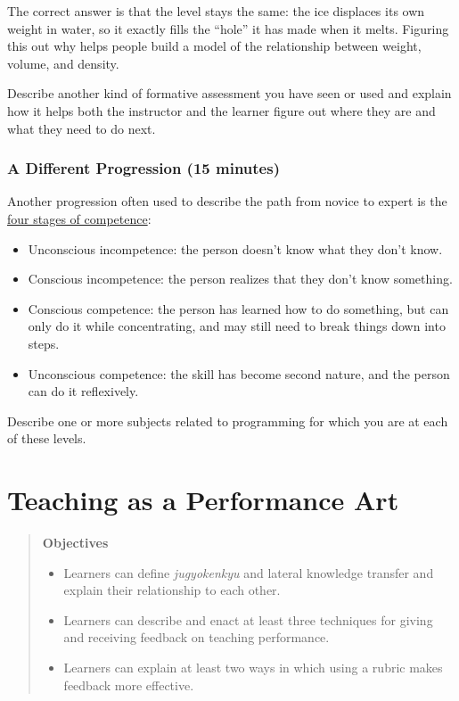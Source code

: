 \documentclass[10pt,statementpaper]{memoir}
\providecommand{\tightlist}{%
  \setlength{\itemsep}{0pt}\setlength{\parskip}{0pt}}
\begin{document}
The correct answer is that the level stays the same: the ice displaces
its own weight in water, so it exactly fills the ``hole'' it has made
when it melts. Figuring this out why helps people build a model of the
relationship between weight, volume, and density.

Describe another kind of formative assessment you have seen or used and
explain how it helps both the instructor and the learner figure out
where they are and what they need to do next.

\subsection{A Different Progression (15
minutes)}\label{a-different-progression-15-minutes}

Another progression often used to describe the path from novice to
expert is the
\href{https://en.wikipedia.org/wiki/Four_stages_of_competence}{four
stages of competence}:

\begin{itemize}
\tightlist
\item
  Unconscious incompetence: the person doesn't know what they don't
  know.
\item
  Conscious incompetence: the person realizes that they don't know
  something.
\item
  Conscious competence: the person has learned how to do something, but
  can only do it while concentrating, and may still need to break things
  down into steps.
\item
  Unconscious competence: the skill has become second nature, and the
  person can do it reflexively.
\end{itemize}

Describe one or more subjects related to programming for which you are
at each of these levels.

\chapter{Teaching as a Performance
Art}\label{teaching-as-a-performance-art}

\begin{quote}
\textbf{Objectives}

\begin{itemize}
\tightlist
\item
  Learners can define \emph{jugyokenkyu} and lateral knowledge transfer
  and explain their relationship to each other.
\item
  Learners can describe and enact at least three techniques for giving
  and receiving feedback on teaching performance.
\item
  Learners can explain at least two ways in which using a rubric makes
  feedback more effective.
\end{itemize}
\end{quote}
\end{document}

